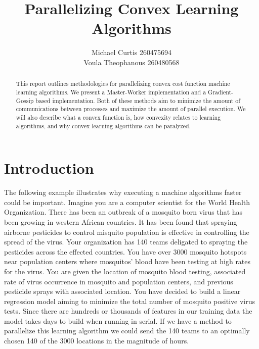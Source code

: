 \documentclass{article}
\theoremstyle{definition}
\begin{document}
\title{Parallelizing Convex Learning Algorithms}
\author{Michael Curtis 260475694\\
Voula Theophanous 260480568}
\maketitle

\begin{abstract}

This report outlines methodologies for parallelizing convex cost function machine learning algorithms. We present a Master-Worker implementation and a Gradient-Gossip based implementation. Both of these methods aim to minimize the amount of communications between processes and maximize the amount of parallel execution. We will also describe what a convex function is, how convexity relates to learning algorithms, and why convex learning algorithms can be paralyzed.

\end{abstract}

\section{Introduction}
The following example illustrates why executing a machine algorithms faster could be important. Imagine you are a computer scientist for the World Health Organization. There has been an outbreak of a mosquito born virus that has been growing in western African countries. It has been found that spraying airborne pesticides to control misquito population is effective in controlling the spread of the virus. Your organization has 140 teams deligated to spraying the pesticides across the effected countries. You have over 3000 mosquito hotspots near population centers where mosquitos' blood have been testing at high rates for the virus. You are given the location of mosquito blood testing, associated rate of virus occurrence in mosquito and population centers, and previous pesticide sprays with associated location. You have decided to build a linear regression model aiming to minimize the total number of mosquito positive virus tests. Since there are hundreds or thousands of features in our training data the model takes days to build when running in serial. If we have a method to parallelize this learning algorithm we could send the 140 teams to an optimally chosen 140 of the 3000 locations in the magnitude of hours.
\end{document}
